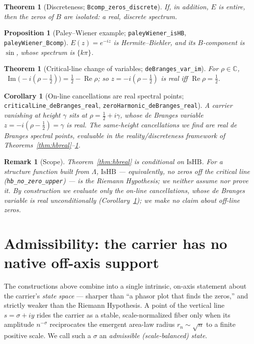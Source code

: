 \documentclass[11pt]{article}
\newtheorem{theorem}[definition]{Theorem}
\newtheorem{corollary}[definition]{Corollary}
\newtheorem{proposition}[definition]{Proposition}
\newtheorem{remark}[definition]{Remark}
\DeclareMathOperator{\Ree}{Re}
\DeclareMathOperator{\Imm}{Im}
\newcommand{\C}{\mathbb{C}}
\newcommand{\code}[1]{\texttt{#1}}
\begin{document}
\begin{theorem}[Discreteness; \code{Bcomp\_zeros\_discrete}]\label{thm:hbdisc}
If, in addition, $E$ is entire, then the zeros of $B$ are isolated: a real, discrete spectrum.
\end{theorem}

\begin{proposition}[Paley--Wiener example; \code{paleyWiener\_isHB}, \code{paleyWiener\_Bcomp}]\label{prop:pw}
$E(z)=e^{-iz}$ is Hermite--Biehler, and its $B$-component is $\sin$, whose spectrum is $\{k\pi\}$.
\end{proposition}

\begin{theorem}[Critical-line change of variables; \code{deBranges\_var\_im}]\label{thm:cov}
For $\rho\in\C$, $\;\Imm\!\big(-i(\rho-\tfrac12)\big)=\tfrac12-\Ree\rho$; so $z=-i(\rho-\tfrac12)$ is
real iff $\Ree\rho=\tfrac12$.
\end{theorem}

\begin{corollary}[On-line cancellations are real spectral points; \code{criticalLine\_deBranges\_real}, \code{zeroHarmonic\_deBranges\_real}]\label{cor:online}
A carrier vanishing at height $\gamma$ sits at $\rho=\tfrac12+i\gamma$, whose de Branges variable
$z=-i(\rho-\tfrac12)=\gamma$ is real. The same-height cancellations we find are real de Branges
spectral points, evaluable in the reality/discreteness framework of
Theorems~\ref{thm:hbreal}--\ref{thm:hbdisc}.
\end{corollary}

\begin{remark}[Scope]\label{rem:hbscope}
Theorem~\ref{thm:hbreal} is conditional on $\mathrm{IsHB}$. For a structure function built from
$\Lambda$, $\mathrm{IsHB}$ --- equivalently, no zeros off the critical line
(\code{hb\_no\_zero\_upper}) --- is the Riemann Hypothesis; we neither assume nor prove it. By
construction we evaluate only the on-line cancellations, whose de Branges variable is real
unconditionally (Corollary~\ref{cor:online}); we make no claim about off-line zeros.
\end{remark}

\section{Admissibility: the carrier has no native off-axis support}\label{sec:admissible}

The constructions above combine into a single intrinsic, on-axis statement about the carrier's
\emph{state space} --- sharper than ``a phasor plot that finds the zeros,'' and strictly weaker than
the Riemann Hypothesis. A point of the vertical line $s=\sigma+iy$ rides the carrier as a stable,
scale-normalized fiber only when its amplitude $n^{-\sigma}$ reciprocates the emergent area-law radius
$r_n\sim\sqrt n$ to a finite positive scale. We call such a $\sigma$ an \emph{admissible
(scale-balanced) state}.
\end{document}

